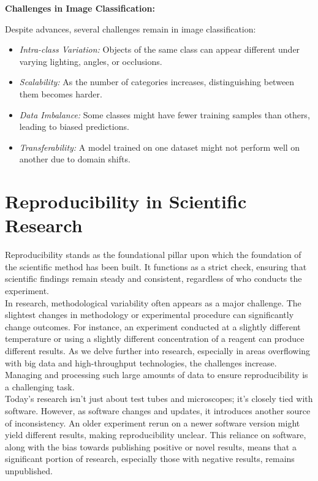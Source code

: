 \textbf{Challenges in Image Classification:}

Despite advances, several challenges remain in image classification:

\begin{itemize}
    \item \textit{Intra-class Variation:} Objects of the same class can appear different under varying lighting, angles, or occlusions.
    \item \textit{Scalability:} As the number of categories increases, distinguishing between them becomes harder.
    \item \textit{Data Imbalance:} Some classes might have fewer training samples than others, leading to biased predictions.
    \item \textit{Transferability:} A model trained on one dataset might not perform well on another due to domain shifts.
\end{itemize}


\section{Reproducibility in Scientific Research}

Reproducibility stands as the foundational pillar upon which the foundation of the scientific method has been built. It functions as a strict check, ensuring that scientific findings remain steady and consistent, regardless of who conducts the experiment.\\

In research, methodological variability often appears as a major challenge. The slightest changes in methodology or experimental procedure can significantly change outcomes. For instance, an experiment conducted at a slightly different temperature or using a slightly different concentration of a reagent can produce different results. As we delve further into research, especially in areas overflowing with big data and high-throughput technologies, the challenges increase. Managing and processing such large amounts of data to ensure reproducibility is a challenging task.\\

Today's research isn't just about test tubes and microscopes; it's closely tied with software. However, as software changes and updates, it introduces another source of inconsistency. An older experiment rerun on a newer software version might yield different results, making reproducibility unclear. This reliance on software, along with the bias towards publishing positive or novel results, means that a significant portion of research, especially those with negative results, remains unpublished.\\

